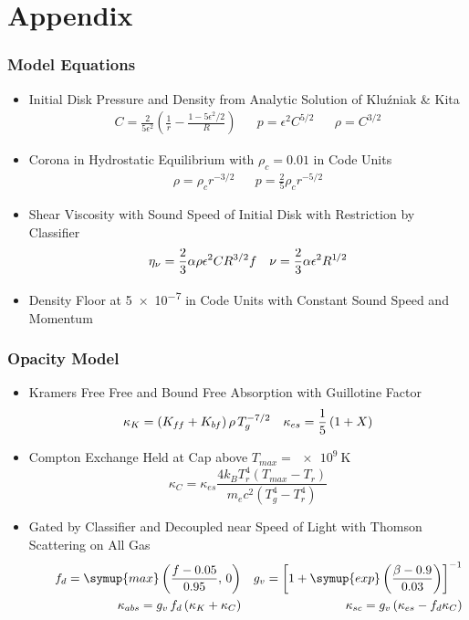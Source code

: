 	\section{Appendix}

	\begin{frame}
		\frametitle{Model Equations}
		\begin{itemize}
			\item Initial Disk Pressure and Density from Analytic Solution of Kluźniak \& Kita
				  \begin{align*}&&&& C = \frac{2}{5 \epsilon^2} \left(\frac{1}{r} - \frac{1 - 5 \epsilon^2 / 2}{R}\right) &&
				  p = \epsilon^2 C^{5/2} && \rho = C^{3/2} &&&&\end{align*}
			\item Corona in Hydrostatic Equilibrium with $\rho_c = 0.01$ in Code Units
				  \begin{align*}&&&& \rho = \rho_c r^{-3/2} && p = \frac{2}{5} \rho_c r^{-5/2} &&&&\end{align*}
			\item Shear Viscosity with Sound Speed of Initial Disk with Restriction by Classifier
				  \begin{align*}&&&& \eta_\nu = \frac{2}{3} \alpha \rho \epsilon^2 C R^{3/2} f &&
				  \nu = \frac{2}{3} \alpha \epsilon^2 R^{1{\kern-0.5pt}/2} &&&&\end{align*}
			\item Density Floor at \num{5e-7} in Code Units with Constant Sound Speed and Momentum
		\end{itemize}
	\end{frame}

	\begin{frame}
		\frametitle{Opacity Model}
		\begin{itemize}
			\item Kramers Free Free and Bound Free Absorption with Guillotine Factor
				  \begin{align*}&&&& \kappa_K = \left(K_{f{\kern-0.5pt}f} + K_{b{\kern-0.5pt}f}\right) \rho \, T_g^{-7/2} &&
				  \kappa_{es} = \frac{1}{5} \left(1 + X\right) &&&&\end{align*}
			\item Compton Exchange Held at Cap above $T_{max} = \qty{e9}{\kelvin}$
				  $$\kappa_C = \kappa_{es} \frac{4 k_B T_r^4 \left(T_{max} - T_r\right)}{m_e c^2 \left(T_g^4 - T_r^4\right)}$$
			\item Gated by Classifier and Decoupled near Speed of Light with Thomson Scattering on All Gas
				  \begin{align*}&&&& f_d = \symup{max}\left(\frac{f - 0.05}{0.95}, \, 0\right) &&
				  g_v = \left[1 + \symup{exp}\left(\frac{\beta - 0.9}{0.03}\right)\right]^{-1} &&&& \\
				  &&&& \kappa_{abs} = g_v \,f_d \left(\kappa_K + \kappa_C\right) &&
				  \kappa_{sc} = g_v \left(\kappa_{es} - f_d \kappa_C\right) &&&&\end{align*}
		\end{itemize}
	\end{frame}


